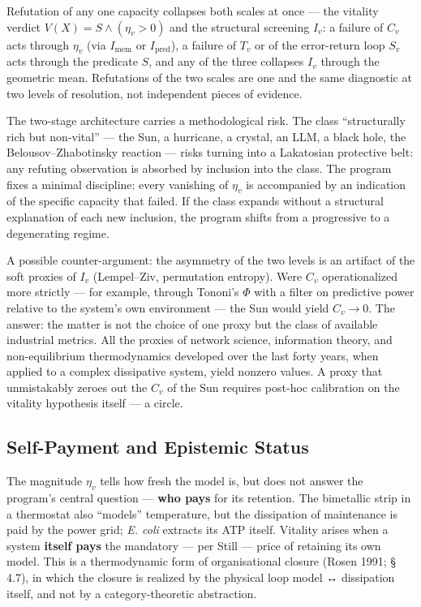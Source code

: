 \documentclass[pdflatex,sn-mathphys-ay]{sn-jnl}
\begin{document}
Refutation of any one capacity collapses both scales at once --- the vitality verdict \(V(X) = S \wedge (\eta_v > 0)\) and the structural screening \(I_v\): a failure of \(C_v\) acts through \(\eta_v\) (via \(I_{\text{mem}}\) or \(I_{\text{pred}}\)), a failure of \(T_v\) or of the error-return loop \(S_v\) acts through the predicate \(S\), and any of the three collapses \(I_v\) through the geometric mean. Refutations of the two scales are one and the same diagnostic at two levels of resolution, not independent pieces of evidence.

The two-stage architecture carries a methodological risk. The class ``structurally rich but non-vital'' --- the Sun, a hurricane, a crystal, an LLM, a black hole, the Belousov--Zhabotinsky reaction --- risks turning into a Lakatosian protective belt: any refuting observation is absorbed by inclusion into the class. The program fixes a minimal discipline: every vanishing of \(\eta_v\) is accompanied by an indication of the specific capacity that failed. If the class expands without a structural explanation of each new inclusion, the program shifts from a progressive to a degenerating regime.

A possible counter-argument: the asymmetry of the two levels is an artifact of the soft proxies of \(I_v\) (Lempel--Ziv, permutation entropy). Were \(C_v\) operationalized more strictly --- for example, through Tononi's \(\Phi\) with a filter on predictive power relative to the system's own environment --- the Sun would yield \(C_v \to 0\). The answer: the matter is not the choice of one proxy but the class of available industrial metrics. All the proxies of network science, information theory, and non-equilibrium thermodynamics developed over the last forty years, when applied to a complex dissipative system, yield nonzero values. A proxy that unmistakably zeroes out the \(C_v\) of the Sun requires post-hoc calibration on the vitality hypothesis itself --- a circle.

\subsection{Self-Payment and Epistemic Status}\label{self-payment-and-epistemic-status}

The magnitude \(\eta_v\) tells how fresh the model is, but does not answer the program's central question --- \textbf{who pays} for its retention. The bimetallic strip in a thermostat also ``models'' temperature, but the dissipation of maintenance is paid by the power grid; \emph{E. coli} extracts its ATP itself. Vitality arises when a system \textbf{itself pays} the mandatory --- per Still --- price of retaining its own model. This is a thermodynamic form of organisational closure (Rosen 1991; § 4.7), in which the closure is realized by the physical loop model ↔ dissipation itself, and not by a category-theoretic abstraction.
\end{document}
